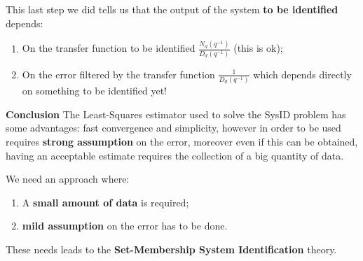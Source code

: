 This last step we did tells us that the output of the system \textbf{to be identified} depends:
\begin{enumerate}
    \item On the transfer function to be identified $\frac{N_d(q^{-1})}{D_d({q^{-1}})}$ (this is ok);
    \item On the error filtered by the transfer function $\frac{1}{D_d(q^{-1})}$ which depends directly on something to be identified  yet!
\end{enumerate}

\noindent
\textbf{Conclusion}
The Least-Squares estimator used to solve the SysID problem has some advantages: fast convergence and simplicity, however in order to be used requires \textbf{strong assumption} on the error, moreover even if this can be obtained, having an acceptable estimate requires the collection of a big quantity of data. 
\begin{center}
    \color{red}
    We need an approach where:
    \begin{enumerate}
        \item A \textbf{small amount of data} is required; 
        \item \textbf{mild assumption} on the error has to be done.
    \end{enumerate}
    These needs leads to the \textbf{Set-Membership System Identification} theory.
\end{center}


  






